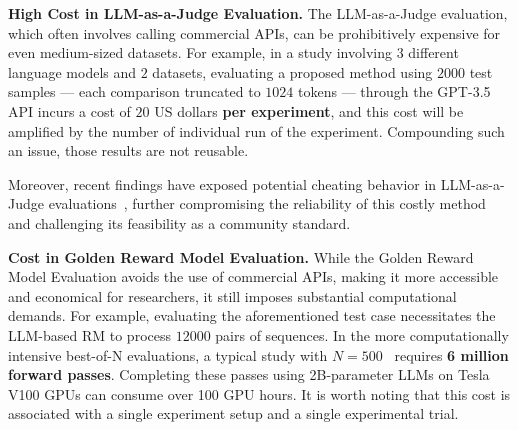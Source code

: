 \textbf{High Cost in LLM-as-a-Judge Evaluation.}
The LLM-as-a-Judge evaluation, which often involves calling commercial APIs, can be prohibitively expensive for even medium-sized datasets. For example, in a study involving $3$ different language models and $2$ datasets, evaluating a proposed method using $2000$ test samples --- each comparison truncated to $1024$ tokens --- through the GPT-3.5 API incurs a cost of $20$ US dollars \textbf{per experiment}, and this cost will be amplified by the number of individual run of the experiment. Compounding such an issue, those results are not reusable.

Moreover, recent findings have exposed potential cheating behavior in LLM-as-a-Judge evaluations~\cite{zheng2024cheating}, further compromising the reliability of this costly method and challenging its feasibility as a community standard.





\textbf{Cost in Golden Reward Model Evaluation.} While the Golden Reward Model Evaluation avoids the use of commercial APIs, making it more accessible and economical for researchers, it still imposes substantial computational demands. For example, evaluating the aforementioned test case necessitates the LLM-based RM to process $12000$ pairs of sequences. In the more computationally intensive best-of-N evaluations, a typical study with $N=500$~\citep[KL divergence approximately 5 Nats,][]{gao2023scaling} requires \textbf{6 million forward passes}. Completing these passes using 2B-parameter LLMs on Tesla V100 GPUs can consume over 100 GPU hours. It is worth noting that this cost is associated with a single experiment setup and a single experimental trial.

